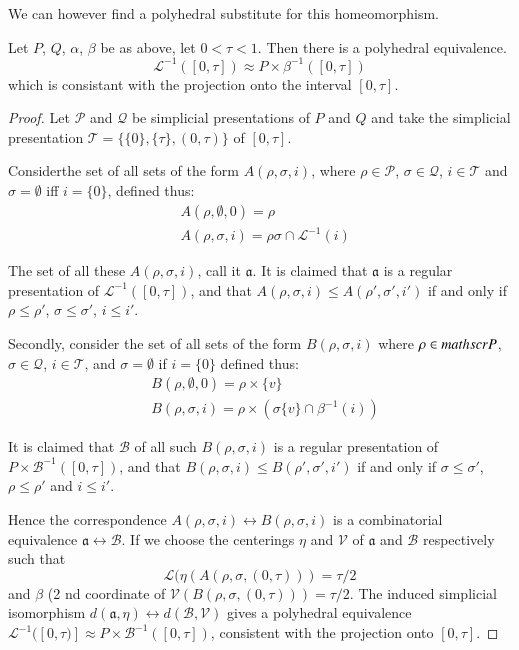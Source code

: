 We can however find a polyhedral substitute for this homeomorphism.

\setcounter{proposition}{7}
\begin{proposition}\label{chap4-prop4.3.8}
Let $P$, $Q$, $\alpha$, $\beta$ be as above, let $0<\tau<1$. Then there is a polyhedral equivalence.
$$
\mathcal{L}^{-1}([0,\tau])\approx P\times \beta^{-1}([0,\tau])
$$
which is consistant with the projection onto the interval $[0,\tau]$.
\end{proposition}

\begin{proof}
Let $\mathscr{P}$ and $\mathcal{Q}$ be simplicial presentations of $P$ and $Q$ and take the simplicial presentation $\mathscr{T}=\{\{0\},\{\tau\},(0,\tau)\}$ of $[0,\tau]$.

Consider\pageoriginale the set of all sets of the form $A(\rho,\sigma,i)$, where $\rho\in \mathscr{P}$, $\sigma\in\mathcal{Q}$, $i\in\mathscr{T}$ and $\sigma=\emptyset$ iff $i=\{0\}$, defined thus:
\begin{align*}
& A(\rho,\emptyset,0)=\rho\\
& A(\rho,\sigma,i)=\rho \sigma\cap \mathcal{L}^{-1}(i)
\end{align*}

The set of all these $A(\rho,\sigma,i)$, call it $\mathfrak{a}$. It is claimed that $\mathfrak{a}$ is a regular presentation of $\mathcal{L}^{-1}([0,\tau])$, and that $A(\rho,\sigma,i)\leq A(\rho',\sigma',i')$ if and only if $\rho\leq \rho'$, $\sigma\leq \sigma'$, $i\leq i'$. 

Secondly, consider the set of all sets of the form $B(\rho,\sigma,i)$ where $\rho\in \\mathscr{P}$, $\sigma\in\mathcal{Q}$, $i\in\mathscr{T}$, and $\sigma=\emptyset$ if $i=\{0\}$ defined thus:
\begin{align*}
& B(\rho,\emptyset,0)=\rho\times\{v\}\\
& B(\rho,\sigma,i)=\rho\times(\sigma\{v\}\cap \beta^{-1}(i))
\end{align*}

It is claimed that $\mathscr{B}$ of all such $B(\rho,\sigma,i)$ is a regular presentation of $P\times \mathscr{B}^{-1}([0,\tau])$, and that $B(\rho,\sigma,i)\leq B(\rho',\sigma',i')$ if and only if $\sigma\leq \sigma'$, $\rho\leq \rho'$ and $i\leq i'$.

Hence the correspondence $A(\rho,\sigma,i)\leftrightarrow B(\rho,\sigma,i)$ is a combinatorial equivalence $\mathfrak{a}\leftrightarrow\mathscr{B}$. If we choose the centerings $\eta$ and $\mathscr{V}$ of $\mathfrak{a}$ and $\mathscr{B}$ respectively such that
$$
\mathcal{L} (\eta(A(\rho,\sigma,(0,\tau)))=\tau/2
$$
and $\beta$ (2 nd coordinate of $\mathscr{V}(B(\rho,\sigma,(0,\tau)))=\tau/2$. The induced simplicial isomorphism $d(\mathfrak{a},\eta)\leftrightarrow d(\mathscr{B},\mathscr{V})$ gives a polyhedral equivalence $\mathcal{L}^{-1}([0,\tau)]\approx P\times \mathscr{B}^{-1}([0,\tau])$, consistent with the projection onto $[0,\tau]$. 


\end{proof}
